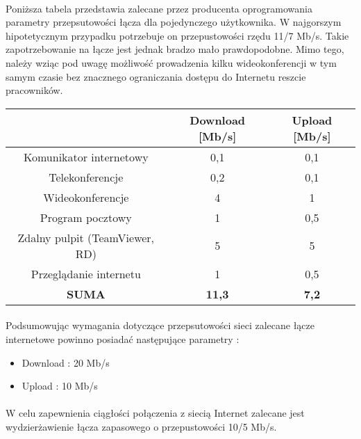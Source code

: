 \paragraph{}
Poniższa tabela przedstawia zalecane przez producenta oprogramowania parametry przepsutowości łącza dla pojedynczego użytkownika. 
W najgorszym hipotetycznym przypadku potrzebuje on przepustowości rzędu 11/7 Mb/s.
Takie zapotrzebowanie na łącze jest jednak bradzo mało prawdopodobne.
Mimo tego, należy wziąc pod uwagę możliwość prowadzenia kilku wideokonferencji w tym samym czasie bez znacznego ograniczania dostępu do Internetu reszcie pracowników.

\begin{center}
    \begin{tabular}{|c|c|c|}
    \hline
       & Download [Mb/s]                & Upload [Mb/s] \\ \hline
       Komunikator internetowy          & 0,1   & 0,1   \\ \hline
       Telekonferencje                  & 0,2   & 0,1   \\ \hline
       Wideokonferencje                 & 4     & 1     \\ \hline
       Program pocztowy                 & 1     & 0,5   \\ \hline
       Zdalny pulpit (TeamViewer, RD)   & 5     & 5     \\ \hline
       Przeglądanie internetu           & 1     & 0,5   \\ \hline
       \textbf{SUMA}					& \textbf{11,3}  & \textbf{7,2}	\\ \hline
   \end{tabular}
\end{center}

\paragraph{}
Podsumowując wymagania dotyczące przepsutowości sieci zalecane łącze internetowe powinno posiadać następujące parametry :
\begin{itemize}
	\item Download : 20 Mb/s
	\item Upload : 10 Mb/s
\end{itemize}

\paragraph{}
W celu zapewnienia ciągłości połączenia z siecią Internet zalecane jest wydzierżawienie łącza zapasowego o przepustowości 10/5 Mb/s.

